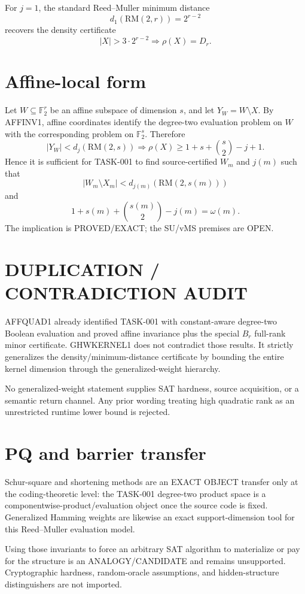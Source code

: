 \documentclass{article}
\begin{document}
For \(j=1\), the standard Reed--Muller minimum distance
\[
d_1(\mathrm{RM}(2,r))=2^{r-2}
\]
recovers the density certificate
\[
|X|>3\cdot2^{r-2}
\Longrightarrow
\rho(X)=D_r.
\]

\section*{Affine-local form}
Let \(W\subseteq\mathbb F_2^r\) be an affine subspace of dimension \(s\), and let \(Y_W=W\setminus X\). By AFFINV1, affine coordinates identify the degree-two evaluation problem on \(W\) with the corresponding problem on \(\mathbb F_2^s\). Therefore
\[
\boxed{
|Y_W|<d_j(\mathrm{RM}(2,s))
\Longrightarrow
\rho(X)\ge 1+s+\binom s2-j+1.
}
\]
Hence it is sufficient for TASK-001 to find source-certified \(W_m\) and \(j(m)\) such that
\[
|W_m\setminus X_m|<d_{j(m)}(\mathrm{RM}(2,s(m)))
\]
and
\[
1+s(m)+\binom{s(m)}2-j(m)=\omega(m).
\]
The implication is PROVED/EXACT; the SU/vMS premises are OPEN.

\section*{DUPLICATION / CONTRADICTION AUDIT}
AFFQUAD1 already identified TASK-001 with constant-aware degree-two Boolean evaluation and proved affine invariance plus the special \(B_r\) full-rank minor certificate. GHWKERNEL1 does not contradict those results. It strictly generalizes the density/minimum-distance certificate by bounding the entire kernel dimension through the generalized-weight hierarchy.

No generalized-weight statement supplies SAT hardness, source acquisition, or a semantic return channel. Any prior wording treating high quadratic rank as an unrestricted runtime lower bound is rejected.

\section*{PQ and barrier transfer}
Schur-square and shortening methods are an EXACT OBJECT transfer only at the coding-theoretic level: the TASK-001 degree-two product space is a componentwise-product/evaluation object once the source code is fixed. Generalized Hamming weights are likewise an exact support-dimension tool for this Reed--Muller evaluation model.

Using those invariants to force an arbitrary SAT algorithm to materialize or pay for the structure is an ANALOGY/CANDIDATE and remains unsupported. Cryptographic hardness, random-oracle assumptions, and hidden-structure distinguishers are not imported.
\end{document}
